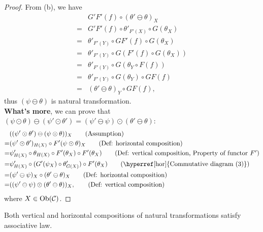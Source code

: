 \documentclass{article}
\begin{document}
\begin{proof}
	From (b), we have
	\begin{align}
		& G'F'(f)\circ(\theta'\ominus\theta)_X\tag{Assumption}\\
		=& G'F'(f)\circ\theta'_{F'(X)}\circ G(\theta_X)\tag{Def: horizontal composition}\\
		=& \theta'_{F'(Y)}\circ GF'(f)\circ G(\theta_X)\tag{Property of natural transformation $\theta'$}\\
		=& \theta'_{F'(Y)}\circ G(F'(f)\circ G(\theta_X))\tag{Property of functor $G$}\\
		=& \theta'_{F'(Y)}\circ G(\theta_Y\circ F(f))\tag{Property of natural transformation $\theta$}\\
		=& \theta'_{F'(Y)}\circ G(\theta_Y)\circ GF(f)\tag{Property of functor $G$}\\
		=& (\theta'\ominus\theta)_Y\circ GF(f)\tag{Def: horizontal composition},
	\end{align}
	thus $(\psi\ominus\theta)$ is natural transformation.\\
		
	{\bf What's more}, we can prove that $(\psi\odot\theta)\ominus(\psi'\odot\theta')=(\psi'\ominus\psi)\odot(\theta'\ominus\theta)$:
	\begin{align}
		 & ((\psi'\odot\theta')\ominus(\psi\odot\theta))_X\tag{Assumption}\\
		=& (\psi'\odot\theta')_{H(X)}\circ F'(\psi\odot\theta)_X\tag{Def: horizontal composition}\\
		=& \psi'_{H(X)}\circ\theta_{H(X)}\circ F'(\theta_X)\circ F'(\theta_X)\tag{Def: vertical composition, Property of functor $F'$}\\
		=& \psi'_{H(X)}\circ(G'(\psi_X)\circ \theta'_{G(X)})\circ F'(\theta_X)\tag{\hyperref[hor]{Commutative diagram (3)}}\\
		=& (\psi'\ominus\psi)_X\circ(\theta'\ominus\theta)_X\tag{Def: horizontal composition}\\
		=& ((\psi'\ominus\psi)\odot(\theta'\ominus\theta))_X,\tag{Def: vertical composition}
	\end{align}
	where $X\in\mathrm{Ob}(\mathcal{C})$.
\end{proof}

\begin{thm}
	Both vertical and horizontal compositions of natural transformations satisfy associative law.
\end{thm}
\end{document}
